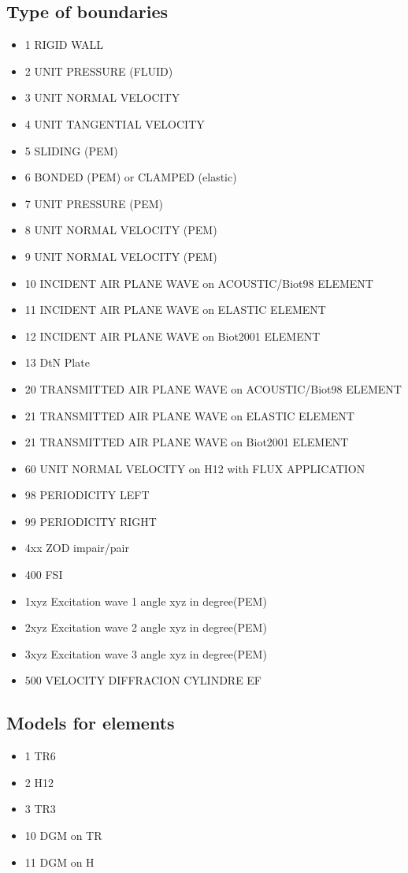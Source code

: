 \documentclass[11pt,A4paper]{book}
\renewcommand{\:}{\tb{:}}
\begin{document}
\subsection{Type of boundaries}
\begin{itemize}
\item 1 RIGID WALL
\item 2 UNIT PRESSURE (FLUID)
\item 3 UNIT NORMAL VELOCITY
\item 4 UNIT TANGENTIAL VELOCITY
\item 5 SLIDING (PEM)
\item 6 BONDED (PEM) or CLAMPED (elastic)
\item 7 UNIT PRESSURE (PEM)
\item 8 UNIT NORMAL VELOCITY (PEM)
\item 9 UNIT NORMAL VELOCITY (PEM)
\item 10 INCIDENT AIR PLANE WAVE on  ACOUSTIC/Biot98  ELEMENT 
\item 11 INCIDENT AIR PLANE WAVE on ELASTIC ELEMENT 
\item 12 INCIDENT AIR PLANE WAVE on Biot2001 ELEMENT
\item 13 DtN Plate
\item 20 TRANSMITTED AIR PLANE WAVE on  ACOUSTIC/Biot98  ELEMENT 
\item 21 TRANSMITTED AIR PLANE WAVE on ELASTIC ELEMENT 
\item 21 TRANSMITTED AIR PLANE WAVE on Biot2001 ELEMENT
\item 60 UNIT NORMAL VELOCITY on H12 with FLUX APPLICATION
\item 98 PERIODICITY LEFT
\item 99 PERIODICITY RIGHT
\item 4xx ZOD impair/pair
\item 400 FSI
\item 1xyz Excitation wave 1 angle xyz in degree(PEM)
\item 2xyz Excitation wave 2 angle xyz in degree(PEM)
\item 3xyz Excitation wave 3 angle xyz in degree(PEM)
\item 500 VELOCITY DIFFRACION CYLINDRE EF
\end{itemize}


\subsection{Models for elements}
\begin{itemize}
\item 1 TR6
\item 2 H12
\item 3 TR3
\item 10 DGM on TR
\item 11 DGM on H
\end{itemize}
\end{document}
